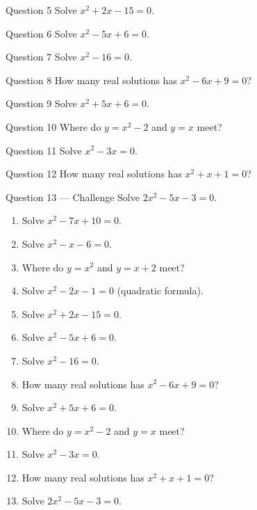 \documentclass[11pt]{article}
\begin{document}
\begin{qbox}{Question 5}
Solve $x^2+2x-15=0$.\workspace{2.4cm}
\end{qbox}

\begin{qbox}{Question 6}
Solve $x^2-5x+6=0$.\workspace{2.4cm}
\end{qbox}

\begin{qbox}{Question 7}
Solve $x^2-16=0$.\workspace{2.4cm}
\end{qbox}

\begin{qbox}{Question 8}
How many real solutions has $x^2-6x+9=0$?\workspace{2.4cm}
\end{qbox}

\begin{qbox}{Question 9}
Solve $x^2+5x+6=0$.\workspace{2.4cm}
\end{qbox}

\begin{qbox}{Question 10}
Where do $y=x^2-2$ and $y=x$ meet?\workspace{2.4cm}
\end{qbox}

\begin{qbox}{Question 11}
Solve $x^2-3x=0$.\workspace{2.4cm}
\end{qbox}

\begin{qbox}{Question 12}
How many real solutions has $x^2+x+1=0$?\workspace{2.4cm}
\end{qbox}

\begin{qbox}{Question 13 --- Challenge}
Solve $2x^2-5x-3=0$.\workspace{3cm}
\end{qbox}

\clearpage
{}

\begin{recapbox}
\begin{multicols}{2}
\small
\begin{enumerate}[leftmargin=*,itemsep=3pt]
  \item Solve $x^2-7x+10=0$.
  \item Solve $x^2-x-6=0$.
  \item Where do $y=x^2$ and $y=x+2$ meet?
  \item Solve $x^2-2x-1=0$ (quadratic formula).
  \item Solve $x^2+2x-15=0$.
  \item Solve $x^2-5x+6=0$.
  \item Solve $x^2-16=0$.
  \item How many real solutions has $x^2-6x+9=0$?
  \item Solve $x^2+5x+6=0$.
  \item Where do $y=x^2-2$ and $y=x$ meet?
  \item Solve $x^2-3x=0$.
  \item How many real solutions has $x^2+x+1=0$?
  \item Solve $2x^2-5x-3=0$.
\end{enumerate}
\end{multicols}
\end{recapbox}
\end{document}
